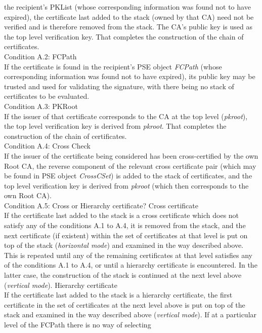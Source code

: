 the recipient's PKList (whose corresponding information was found not to have expired),
the certificate last added to the stack (owned by that CA) need not be verified 
and is therefore removed from the stack. The CA's public key is used as the 
top level verification key. That completes the construction of the chain of
certificates.
\\ [1em]
Condition A.2: FCPath \\
If the certificate is found in the recipient's PSE object {\em FCPath} (whose corresponding 
information was found not to have expired), its public
key may be trusted and used for validating the signature, with there being no stack of 
certificates to be evaluated.
\\ [1em]
Condition A.3: PKRoot \\
If the issuer of that certificate corresponds to the CA at the top level
({\em pkroot}), the top level verification key is derived from {\em pkroot}.
That completes the construction of the chain of certificates.
\\ [1em]
Condition A.4: Cross Check \\
If the issuer of the certificate being considered has been cross-certified by the own Root CA, the 
reverse component of the relevant cross certificate pair (which may be found in PSE
object {\em CrossCSet}) is added to the stack of certificates, 
and the top level verification key is derived from {\em pkroot} (which then corresponds
to the own Root CA).
\\ [1em]
Condition A.5: Cross or Hierarchy certificate? 
\bi
\m Cross certificate \\
If the certificate last added to the stack is
a cross certificate which does not satisfy any of the conditions A.1 to A.4,
it is removed from the stack, and the next certificate (if existent) within the 
set of certificates at that level is put on top of the stack 
({\em horizontal mode}) and examined in the way described above.
This is repeated until any of the remaining certificates at that level satisfies 
any of the conditions A.1 to A.4, or until a hierarchy certificate is encountered. 
In the latter case, the construction of the stack is continued at the next level 
above ({\em vertical mode}).
\m Hierarchy certificate \\
If the certificate last added to the stack is
a hierarchy certificate, the first certificate in the set of certificates at
the next level above is put on top of the stack and examined in the way
described above ({\em vertical mode}).
\ei
If at a particular level of the FCPath there is no way of selecting
